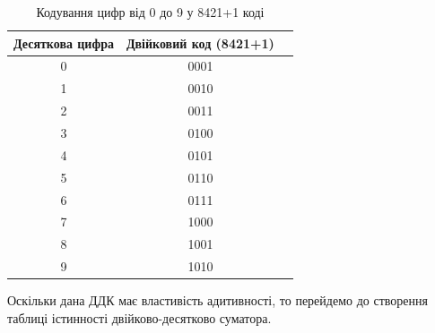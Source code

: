 \documentclass[12pt,a4paper]{article}
\begin{document}
    \begin{table}[h!]
        \centering
        \renewcommand{\arraystretch}{1.2}
        \begin{tabular}{|c|c|c|}
        \hline
        Десяткова цифра & Двійковий код (8421+1) \\
        \hline
        0 & 0001 \\
        1 & 0010 \\
        2 & 0011 \\
        3 & 0100 \\
        4 & 0101 \\
        5 & 0110 \\
        6 & 0111 \\
        7 & 1000 \\
        8 & 1001 \\
        9 & 1010 \\
        \hline
        \end{tabular}
        \caption{Кодування цифр від 0 до 9 у 8421+1 коді}
    \end{table}

    Оскільки дана ДДК має властивість адитивності, то перейдемо до створення
    таблиці істинності двійково-десятково суматора.

    \newpage
\end{document}
